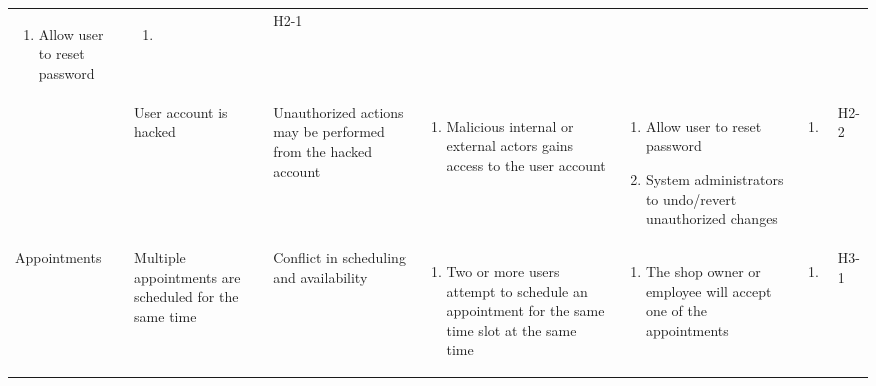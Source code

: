 \documentclass{article}
\begin{document}
\begin{landscape}
\begin{longtable}{|p{}|p{}|p{}|p{}|p{}|p{}|p{}|}
\begin{enumerate}[label=\alph*., leftmargin=*]
			   \item Allow user to reset password
		   \end{enumerate}
		 & \begin{enumerate}[label=\alph*., leftmargin=*]
			   \item
		   \end{enumerate}
		 & H2-1                                                                                              \\
		\cline{2-7}
		 & User account is hacked
		 & Unauthorized actions may be performed from the hacked account
		 & \begin{enumerate}[label=\alph*., leftmargin=*]
			   \item Malicious internal or external actors gains access to the user account
		   \end{enumerate}
		 & \begin{enumerate}[label=\alph*., leftmargin=*]
			   \item Allow user to reset password
			   \item System administrators to undo/revert unauthorized changes
		   \end{enumerate}
		 & \begin{enumerate}[label=\alph*., leftmargin=*]
			   \item
		   \end{enumerate}
		 & H2-2                                                                                              \\
		\hline
		Appointments
		 & Multiple appointments are scheduled for the same time
		 & Conflict in scheduling and availability
		 & \begin{enumerate}[label=\alph*., leftmargin=*]
			   \item Two or more users attempt to schedule an appointment for the same time slot at the same time
		   \end{enumerate}
		 & \begin{enumerate}[label=\alph*., leftmargin=*]
			   \item The shop owner or employee will accept one of the appointments
		   \end{enumerate}
		 & \begin{enumerate}[label=\alph*., leftmargin=*]
			   \item
		   \end{enumerate}
		 & H3-1                                                                                              \\

\end{longtable}
\end{landscape}
\end{document}
